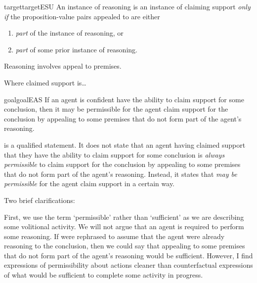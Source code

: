 \begin{note}
  \begin{restatable}{target}{targetESU}
    \label{denied-claim}
    An instance of reasoning is an instance of claiming support \emph{only if} the proposition-value pairs appealed to are either
    \begin{enumerate}
    \item \emph{part} of the instance of reasoning, or
    \item \emph{part} of some prior instance of reasoning.
    \end{enumerate}
  \end{restatable}
  {\color{red} Reasoning involves appeal to premises.}
\end{note}

\begin{note}
  Where claimed support is\dots
\end{note}

\begin{note}
  \begin{restatable}{goal}{goalEAS}
    \label{prop:EAS}
    If an agent is confident have the ability to claim support for some conclusion, then it may be permissible for the agent claim support for the conclusion by appealing to some premises that do not form part of the agent's reasoning.
  \end{restatable}

  \EAS{} is a qualified statement.
  It does not state that an agent having claimed support that they have the ability to claim support for some conclusion is \emph{always permissible} to claim support for the conclusion by appealing to some premises that do not form part of the agent's reasoning.
  Instead, it states that \emph{may be permissible} for the agent claim support in a certain way.

  Two brief clarifications:
\end{note}

\begin{note}
  First, we use the term `permissible' rather than `sufficient' as we are describing some volitional activity.
  We will not argue that an agent is required to perform some reasoning.
  If \EAS{} were rephrased to assume that the agent were already reasoning to the conclusion, then we could say that appealing to some premises that do not form part of the agent's reasoning would be sufficient.
  However, I find expressions of permissibility about actions cleaner than counterfactual expressions of what would be sufficient to complete some activity in progress.
\end{note}

